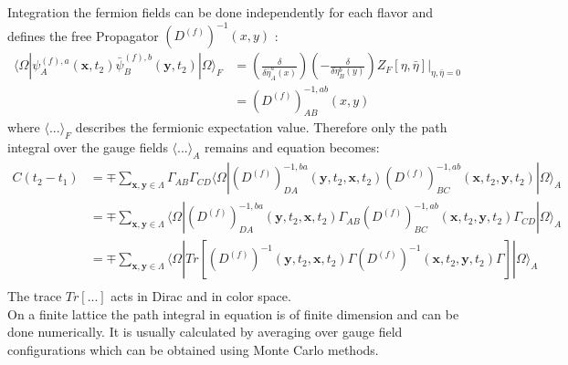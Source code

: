         Integration the fermion fields can be done independently for each flavor and defines the free Propagator $(D^{(f)})^{-1}(x,y)$ \cite{qcd2_script_wagner}:
        \begin{equation}
            \begin{aligned}
                \langle\Omega|\psi^{(f),a}_A(\textbf{x}, t_2)\bar{\psi}^{(f),b}_B(\textbf{y}, t_2)|\Omega\rangle_F &= 
                (\frac{\delta}{\delta\bar{\eta}^a_A(x)})(-\frac{\delta}{\delta{\eta}^b_B(y)})Z_F[\eta,\bar{\eta}]\Big |_{\eta,\bar{\eta}=0}\\
                &= (D^{(f)})_{AB}^{-1,ab}(x,y)
            \end{aligned}
        \end{equation}
        where $\langle...\rangle_F$ describes the fermionic expectation value. Therefore only the path integral over the gauge fields $\langle...\rangle_A$ remains and equation  becomes:
        \begin{equation}\label{correlator_final}
            \begin{aligned}
                C(t_2 - t_1) &= \mp \sum_{\textbf{x},\textbf{y}\in\Lambda}\Gamma_{AB}\Gamma_{CD}
                \langle\Omega|(D^{(f)})_{DA}^{-1,ba}(\textbf{y},t_2,\textbf{x},t_2)
                (D^{(f)})_{BC}^{-1,ab}(\textbf{x},t_2,\textbf{y},t_2)|\Omega\rangle_A\\
                &= \mp \sum_{\textbf{x},\textbf{y}\in\Lambda}
                \langle\Omega|(D^{(f)})_{DA}^{-1,ba}(\textbf{y},t_2,\textbf{x},t_2)\Gamma_{AB}
                (D^{(f)})_{BC}^{-1,ab}(\textbf{x},t_2,\textbf{y},t_2)\Gamma_{CD}|\Omega\rangle_A\\
                &= \mp \sum_{\textbf{x},\textbf{y}\in\Lambda}
                \langle\Omega|Tr[(D^{(f)})^{-1}(\textbf{y},t_2,\textbf{x},t_2)\Gamma
                (D^{(f)})^{-1}(\textbf{x},t_2,\textbf{y},t_2)\Gamma]|\Omega\rangle_A\\
            \end{aligned}
        \end{equation}
        The trace $Tr[...]$ acts in Dirac and in color space.\\
        
        On a finite lattice the path integral in equation  is of finite dimension and can be done numerically. It is usually calculated by averaging over gauge field configurations which can be obtained using Monte Carlo methods.